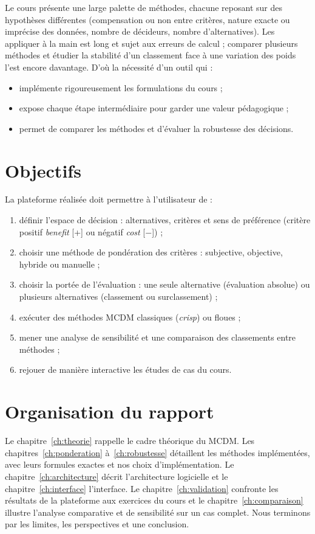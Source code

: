 \documentclass[11pt,a4paper]{report}
\theoremstyle{definition}
\theoremstyle{remark}
\begin{document}
Le cours présente une large palette de méthodes, chacune reposant sur des hypothèses différentes
(compensation ou non entre critères, nature exacte ou imprécise des données, nombre de décideurs, nombre
d'alternatives). Les appliquer à la main est long et sujet aux erreurs de calcul ; comparer plusieurs
méthodes et étudier la stabilité d'un classement face à une variation des poids l'est encore davantage.
D'où la nécessité d'un outil qui :
\begin{itemize}
  \item implémente rigoureusement les formulations du cours ;
  \item expose chaque étape intermédiaire pour garder une valeur pédagogique ;
  \item permet de comparer les méthodes et d'évaluer la robustesse des décisions.
\end{itemize}

\section{Objectifs}

La plateforme réalisée doit permettre à l'utilisateur de :
\begin{enumerate}
  \item définir l'espace de décision : alternatives, critères et sens de préférence (critère positif
        \emph{benefit} [+] ou négatif \emph{cost} [$-$]) ;
  \item choisir une méthode de pondération des critères : subjective, objective, hybride ou manuelle ;
  \item choisir la portée de l'évaluation : une seule alternative (évaluation absolue) ou plusieurs
        alternatives (classement ou surclassement) ;
  \item exécuter des méthodes MCDM classiques (\emph{crisp}) ou floues ;
  \item mener une analyse de sensibilité et une comparaison des classements entre méthodes ;
  \item rejouer de manière interactive les études de cas du cours.
\end{enumerate}

\section{Organisation du rapport}

Le chapitre~\ref{ch:theorie} rappelle le cadre théorique du MCDM. Les chapitres~\ref{ch:ponderation}
à~\ref{ch:robustesse} détaillent les méthodes implémentées, avec leurs formules exactes et nos choix
d'implémentation. Le chapitre~\ref{ch:architecture} décrit l'architecture logicielle et le
chapitre~\ref{ch:interface} l'interface. Le chapitre~\ref{ch:validation} confronte les résultats de la
plateforme aux exercices du cours et le chapitre~\ref{ch:comparaison} illustre l'analyse comparative et de
sensibilité sur un cas complet. Nous terminons par les limites, les perspectives et une conclusion.
\end{document}
